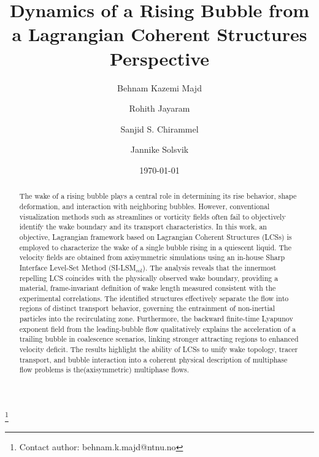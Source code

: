 \documentclass[aps,prfluids,reprint,nofootinbib,onecolumn,groupedaddress,showkeys]{revtex4-2}
\begin{document}
	
	\linenumbers
	
	\title{Dynamics of a Rising Bubble from a Lagrangian Coherent Structures Perspective}
	
	\author{Behnam Kazemi Majd}
	\thanks{Contact author: behnam.k.majd@ntnu.no}
	\author{Rohith Jayaram}
	\author{Sanjid S. Chirammel}
	\author{Jannike Solsvik}
	
	
	\date{\today}
	
	\begin{abstract}
		The wake of a rising bubble plays a central role in determining its rise behavior, shape deformation, and interaction with neighboring bubbles. However, conventional visualization methods such as streamlines or vorticity fields often fail to objectively identify the wake boundary and its transport characteristics. In this work, an objective, Lagrangian framework based on Lagrangian Coherent Structures (LCSs) is employed to characterize the wake of a single bubble rising in a quiescent liquid. The velocity fields are obtained from axisymmetric simulations using an in-house Sharp Interface Level-Set Method (SI-LSM$_\text{col}$). The analysis reveals that the innermost repelling LCS coincides with the physically observed wake boundary, providing a material, frame-invariant definition of wake length measured consistent with the experimental correlations. The identified structures effectively separate the flow into regions of distinct transport behavior, governing the entrainment of non-inertial particles into the recirculating zone. Furthermore, the backward finite-time Lyapunov exponent field from the leading-bubble flow qualitatively {\color{black}explains} the acceleration of a trailing bubble in coalescence scenarios, linking stronger attracting regions to enhanced velocity deficit. The results highlight the ability of LCSs to unify wake topology, tracer transport, and bubble interaction into a coherent physical description of multiphase flow problems is the(axisymmetric) multiphase flows.
	\end{abstract}
	
	
	\maketitle
	
\end{document}
